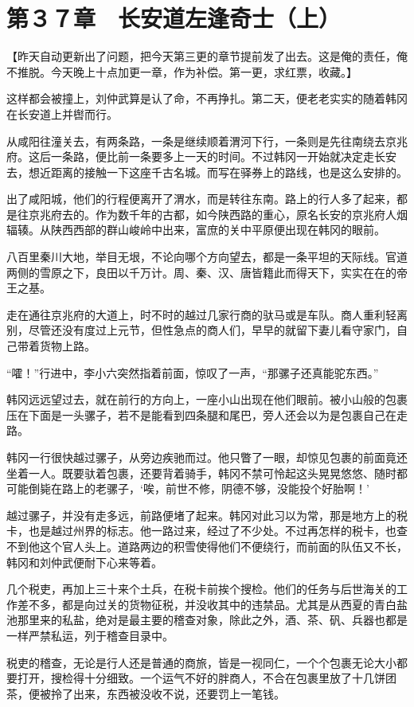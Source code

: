 \section{第３７章　长安道左逢奇士（上）}

【昨天自动更新出了问题，把今天第三更的章节提前发了出去。这是俺的责任，俺不推脱。今天晚上十点加更一章，作为补偿。第一更，求红票，收藏。】

这样都会被撞上，刘仲武算是认了命，不再挣扎。第二天，便老老实实的随着韩冈在长安道上并辔而行。

从咸阳往潼关去，有两条路，一条是继续顺着渭河下行，一条则是先往南绕去京兆府。这后一条路，便比前一条要多上一天的时间。不过韩冈一开始就决定走长安去，想近距离的接触一下这座千古名城。而写在驿券上的路线，也是这么安排的。

出了咸阳城，他们的行程便离开了渭水，而是转往东南。路上的行人多了起来，都是往京兆府去的。作为数千年的古都，如今陕西路的重心，原名长安的京兆府人烟辐辏。从陕西西部的群山峻岭中出来，富庶的关中平原便出现在韩冈的眼前。

八百里秦川大地，举目无垠，不论向哪个方向望去，都是一条平坦的天际线。官道两侧的雪原之下，良田以千万计。周、秦、汉、唐皆籍此而得天下，实实在在的帝王之基。

走在通往京兆府的大道上，时不时的越过几家行商的驮马或是车队。商人重利轻离别，尽管还没有度过上元节，但性急点的商人们，早早的就留下妻儿看守家门，自己带着货物上路。

“嚯！”行进中，李小六突然指着前面，惊叹了一声，“那骡子还真能驼东西。”

韩冈远远望过去，就在前行的方向上，一座小山出现在他们眼前。被小山般的包裹压在下面是一头骡子，若不是能看到四条腿和尾巴，旁人还会以为是包裹自己在走路。

韩冈一行很快越过骡子，从旁边疾驰而过。他只瞥了一眼，却惊见包裹的前面竟还坐着一人。既要驮着包裹，还要背着骑手，韩冈不禁可怜起这头晃晃悠悠、随时都可能倒毙在路上的老骡子，‘唉，前世不修，阴德不够，没能投个好胎啊！’

越过骡子，并没有走多远，前路便堵了起来。韩冈对此习以为常，那是地方上的税卡，也是越过州界的标志。他一路过来，经过了不少处。不过再怎样的税卡，也查不到他这个官人头上。道路两边的积雪使得他们不便绕行，而前面的队伍又不长，韩冈和刘仲武便耐下心来等着。

几个税吏，再加上三十来个土兵，在税卡前挨个搜检。他们的任务与后世海关的工作差不多，都是向过关的货物征税，并没收其中的违禁品。尤其是从西夏的青白盐池那里来的私盐，绝对是最主要的稽查对象，除此之外，酒、茶、矾、兵器也都是一样严禁私运，列于稽查目录中。

税吏的稽查，无论是行人还是普通的商旅，皆是一视同仁，一个个包裹无论大小都要打开，搜检得十分细致。一个运气不好的胖商人，不合在包裹里放了十几饼团茶，便被拎了出来，东西被没收不说，还要罚上一笔钱。

